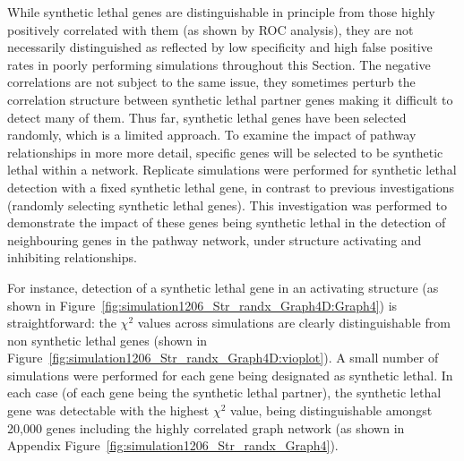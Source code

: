 While \gls{synthetic lethal} genes are distinguishable in principle from those highly positively correlated with them (as shown by \gls{ROC} analysis), they are not necessarily distinguished as reflected by low specificity and high false positive rates in poorly performing simulations throughout this Section. The negative correlations are not subject to the same issue, they sometimes perturb the correlation structure between \gls{synthetic lethal} partner genes making it difficult to detect many of them. Thus far, \gls{synthetic lethal} genes have been selected randomly, which is a limited approach. To examine the impact of pathway relationships in more more detail, specific genes will be selected to be \gls{synthetic lethal} within a network. Replicate simulations were performed for \gls{synthetic lethal} detection with a fixed \gls{synthetic lethal} gene, in contrast to previous investigations (randomly selecting \gls{synthetic lethal} genes). This investigation was performed to demonstrate the impact of these genes being \gls{synthetic lethal} in the detection of neighbouring genes in the pathway network, under  structure activating and inhibiting relationships.

For instance, detection of a \gls{synthetic lethal} gene in an activating  structure (as shown in Figure~\ref{fig:simulation1206_Str_randx_Graph4D:Graph4}) is straightforward: the $\chi^2$ values across simulations are clearly distinguishable from non synthetic lethal genes (shown in Figure~\ref{fig:simulation1206_Str_randx_Graph4D:vioplot}). A small number of simulations were performed for each gene being designated as \gls{synthetic lethal}. In each case (of each gene being the \gls{synthetic lethal} partner), the \gls{synthetic lethal} gene was detectable with the highest $\chi^2$ value, being distinguishable amongst 20,000 genes including the highly correlated graph network (as shown in Appendix Figure~\ref{fig:simulation1206_Str_randx_Graph4}).

